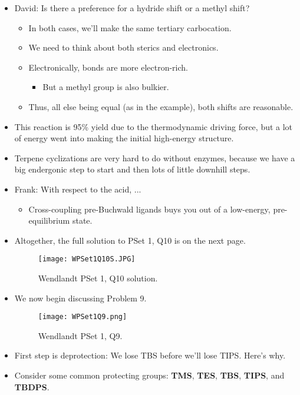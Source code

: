 \documentclass[../notes.tex]{subfiles}
\begin{document}
\begin{itemize}
\begin{itemize}
    \end{itemize}
    \item David: Is there a preference for a hydride shift or a methyl shift?
    \begin{itemize}
        \item In both cases, we'll make the same tertiary carbocation.
        \item We need to think about both sterics and electronics.
        \item Electronically,  bonds are more electron-rich.
        \begin{itemize}
            \item But a methyl group is also bulkier.
        \end{itemize}
        \item Thus, all else being equal (as in the example), both shifts are reasonable.
    \end{itemize}
    \item This reaction is 95\% yield due to the thermodynamic driving force, but a lot of energy went into making the initial high-energy structure.
    \item Terpene cyclizations are very hard to do without enzymes, because we have a big endergonic step to start and then lots of little downhill steps.
    \item Frank: With respect to the acid, ...
    \begin{itemize}
        \item Cross-coupling pre-Buchwald ligands buys you out of a low-energy, pre-equilibrium state.
    \end{itemize}
    \item Altogether, the full solution to PSet 1, Q10 is on the next page.
    \begin{figure}[H]
        \centering
        \texttt{[image: WPSet1Q10S.JPG]}
        \caption{Wendlandt PSet 1, Q10 solution.}
        \label{fig:WPSet1Q10S}
    \end{figure}
    \pagebreak
    \item We now begin discussing Problem 9.
    \begin{figure}[h!]
        \centering
        \texttt{[image: WPSet1Q9.png]}
        \caption{Wendlandt PSet 1, Q9.}
        \label{fig:WPSet1Q9}
    \end{figure}
    \item First step is deprotection: We lose TBS before we'll lose TIPS. Here's why.
    \item Consider some common protecting groups: \textbf{TMS}, \textbf{TES}, \textbf{TBS}, \textbf{TIPS}, and \textbf{TBDPS}.

\end{itemize}
\end{document}
